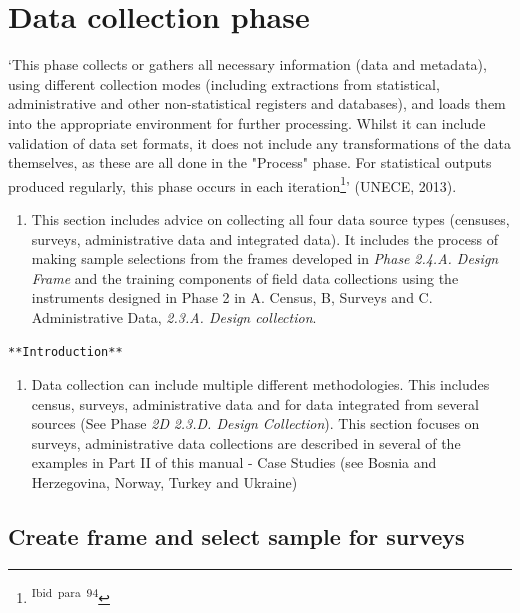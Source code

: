 \documentclass[
]{article}
\providecommand{\tightlist}{%
  \setlength{\itemsep}{0pt}\setlength{\parskip}{0pt}}
\begin{document}
\hypertarget{data-collection-phase}{%
\section{Data collection phase}\label{data-collection-phase}}

`This phase collects or gathers all necessary information (data and
metadata), using different collection modes (including extractions from
statistical, administrative and other non-statistical registers and
databases), and loads them into the appropriate environment for further
processing. Whilst it can include validation of data set formats, it
does not include any transformations of the data themselves, as these
are all done in the "Process" phase. For statistical outputs produced
regularly, this phase occurs in each iteration\footnote{\textsuperscript{Ibid~para~94}}' (UNECE, 2013).

\begin{enumerate}
\def\labelenumi{\arabic{enumi}.}
\setcounter{enumi}{317}
\tightlist
\item
  This section includes advice on collecting all four data source
  types (censuses, surveys, administrative data and integrated data).
  It includes the process of making sample selections from the frames
  developed in \emph{Phase} \emph{2.4.A. Design Frame} and the training
  components of field data collections using the instruments designed
  in Phase 2 in A. Census, B, Surveys and C. Administrative Data,
  \emph{2.3.A. Design collection}.
\end{enumerate}

\begin{verbatim}
**Introduction**
\end{verbatim}

\begin{enumerate}
\def\labelenumi{\arabic{enumi}.}
\setcounter{enumi}{318}
\tightlist
\item
  Data collection can include multiple different methodologies. This
  includes census, surveys, administrative data and for data
  integrated from several sources (See Phase \emph{2D} \emph{2.3.D. Design
  Collection}). This section focuses on surveys, administrative data
  collections are described in several of the examples in Part II of
  this manual - Case Studies (see Bosnia and Herzegovina, Norway,
  Turkey and Ukraine)
\end{enumerate}

\hypertarget{create-frame-and-select-sample-for-surveys}{%
\subsection{Create frame and select sample for surveys}\label{create-frame-and-select-sample-for-surveys}}
\end{document}
